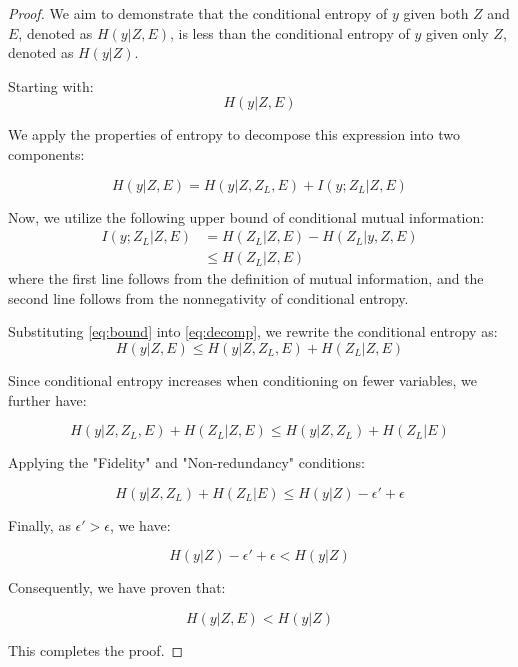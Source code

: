 \documentclass{article}
\begin{document}
\begin{proof}

We aim to demonstrate that the conditional entropy of $y$ given both $Z$ and $E$, denoted as $H(y | Z, E)$, is less than the conditional entropy of $y$ given only $Z$, denoted as $H(y | Z)$. 

Starting with:
\begin{equation}
H(y | Z, E)
\end{equation}

We apply the properties of entropy to decompose this expression into two components:

\begin{equation}
H(y | Z, E) = H(y | Z, Z_L, E) + I(y; Z_L | Z, E) \label{eq:decomp}
\end{equation}



Now, we utilize the following upper bound of conditional mutual information:
\begin{align}
I(y; Z_L | Z, E) &= H(Z_L | Z, E) - H(Z_L | y, Z, E) \\
& \leq H(Z_L | Z, E) \label{eq:bound}
\end{align}
where the first line follows from the definition of mutual information, and the second line follows from the nonnegativity of conditional entropy.

Substituting \eqref{eq:bound} into \eqref{eq:decomp}, we rewrite the conditional entropy as:
\begin{equation}
H(y | Z, E) \leq H(y | Z, Z_L, E) + H(Z_L | Z, E)
\end{equation}

Since conditional entropy increases when conditioning on fewer variables, we further have:

\begin{equation}
H(y | Z, Z_L, E) + H(Z_L | Z, E) \leq H(y | Z, Z_L) + H(Z_L | E)
\end{equation}

Applying the "Fidelity" and "Non-redundancy" conditions:

\begin{equation}
H(y | Z, Z_L) + H(Z_L | E) \leq H(y | Z) - \epsilon' + \epsilon
\end{equation}

Finally, as $\epsilon' > \epsilon$, we have:

\begin{equation}
H(y | Z) - \epsilon' + \epsilon < H(y | Z)
\end{equation}

Consequently, we have proven that:

\begin{equation}
H(y | Z, E) < H(y | Z)
\end{equation}

This completes the proof.
\end{proof}
\end{document}
